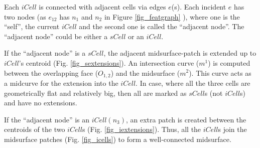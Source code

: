 %	
%
Each $iCell$ is connected with adjacent cells via edges $e$(s).  Each incident $e$ has two nodes (as $e_{12}$ has $n_1$ and $n_2$  in Figure \ref{fig_featgraph} ), where one is the ``self'', the current $iCell$ and the second one is called the ``adjacent node''.  The ``adjacent node'' could be either a $sCell$ or an $iCell$.  

If the ``adjacent node'' is a $sCell$, the adjacent midsurface-patch is extended up to $iCell$'s centroid (Fig. \ref{fig_sextensions}). An intersection curve ($m^1$) is computed between the overlapping face ($O_{1,2}$) and the midsurface ($m^2$). This curve acts as a midcurve for the extension into the $iCell$. In case, where all the three cells are geometrically flat and relatively big, then all are marked as  $sCell$s (not $iCell$s) and have no extensions. 

If the ``adjacent node'' is an $iCell(n_3)$, an extra patch is created between the centroids of the two $iCell$s (Fig. \ref{fig_iextensions}). Thus, all the $iCell$s join the midsurface patches (Fig. \ref{fig_icells}) to form a well-connected midsurface.


